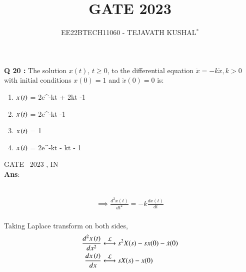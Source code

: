 \documentclass[journal,12pt,twocolumn]{IEEEtran}
\theoremstyle{remark}
\begin{document}

\vspace{3cm}

\title{GATE 2023}
\author{EE22BTECH11060 - TEJAVATH KUSHAL$^{*}$%
}
\maketitle
\newpage
\bigskip

\renewcommand{\thefigure}{\theenumi}
\renewcommand{\thetable}{\theenumi}

\maketitle
\noindent \textbf{Q 20 :} The solution \(x(t)\), \(t \geq 0\), to the differential equation
$\ddot{x} = -k\dot{x} , k > 0$
with initial conditions \(x(0) = 1\) and \(\dot{x} (0) = 0\) is: 
\begin{enumerate}[label = (\Alph*)]
    \item $x\left(t\right)$ = 2e^{-kt} + 2kt -1 \label{gate.in.20.a}\\
    \item $x\left(t\right)$ = 2e^{-kt} -1 \label{gate.in.20.b}\\
    \item $x\left(t\right)$ = 1 \label{gate.in.20.c}\\
    \item $x\left(t\right)$ = 2e^{-kt} - kt - 1 \label{gate.in.20.d}
\end{enumerate}
\hfill{GATE ~2023  , IN} 
\\
\noindent \textbf{Ans}:\\ \\
\fi
\begin{table}[h]

\end{table}
\begin{align}
    \implies \frac{d^2 x(t)}{dt^2} = -k\frac{dx(t)}{dt}
\end{align}\\

Taking Laplace transform on both sides,\\
\begin{align}
\label{eq:gate2023.in.20.2}\frac{d^2x\brak{t}}{dx^2} &\system{L}
       s^2X(s)-sx(0)-\dot{x}(0)\\
\label{eq:gate2023.in.20.3}\frac{dx\brak{t}}{dx} &\system{L} sX(s)-x(0)
\end{align}
\end{document}
